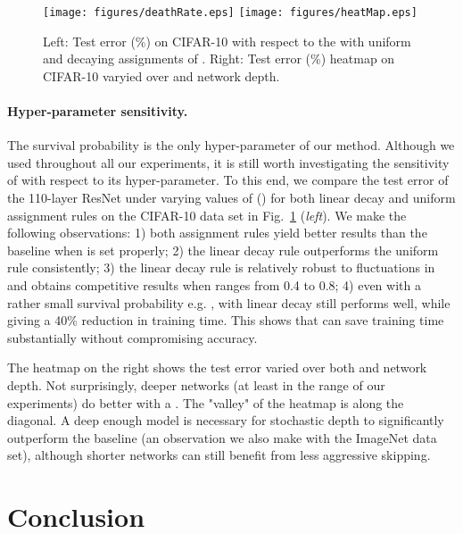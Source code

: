 \documentclass[runningheads]{llncs}
\begin{document}
\begin{figure}[t]
	\vspace{-2ex}
	\begin{center}
		\centerline{\texttt{[image: figures/deathRate.eps]}
		\texttt{[image: figures/heatMap.eps]}}
	\end{center}
	\vspace{-4ex}
    \label{figure.deathRate}
	\caption{Left: Test error (\%) on CIFAR-10 with respect to the   with uniform and decaying assignments of . Right: Test error (\%) heatmap on CIFAR-10 varyied over  and network depth.}
	\vspace{-4ex}
	\label{figure.deathRate}
\end{figure}

\paragraph{\textbf{Hyper-parameter sensitivity.}}
The survival probability  is the only hyper-parameter of our method. Although we used  throughout all our experiments, it is still worth investigating the sensitivity of \name{} with respect to its hyper-parameter. To this end, we compare the test error of the 110-layer ResNet under varying values of  () for both linear decay and uniform assignment rules on the CIFAR-10 data set in Fig.~\ref{figure.deathRate} (\textit{left}). We make the following observations: 1) both assignment rules yield better results than the baseline when  is set properly; 2) the linear decay rule outperforms the uniform rule consistently; 3) the linear decay rule is relatively robust to fluctuations in  and obtains competitive results when  ranges from 0.4 to 0.8; 4) even with a rather small survival probability e.g. , \name{} with linear decay still performs well, while giving a 40\% reduction in training time. This shows that \name{} can save training time substantially without compromising accuracy.

The heatmap on the right shows the test error varied over both  and network depth. Not surprisingly, deeper networks (at least in the range of our experiments) do better with a . The "valley" of the heatmap is along the diagonal. A deep enough model is necessary for stochastic depth to significantly outperform the baseline (an observation we also make with the ImageNet data set), although shorter networks can still benefit from less aggressive skipping.
 


\section{Conclusion}
\end{document}
